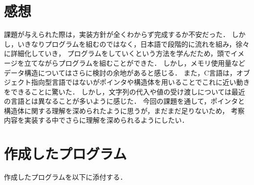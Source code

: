 \documentclass[a4j,11pt]{jarticle}
\begin{document}
\section{感想}
課題が与えられた際は，実装方針が全くわからず完成するか不安だった．
しかし，いきなりプログラムを組むのではなく，日本語で段階的に流れを組み，徐々に詳細化していき，
プログラムをしていくという方法を学んだため，頭でイメージを立てながらプログラムを組むことができた．
しかし，メモリ使用量などデータ構造についてはさらに検討の余地があると感じる．
また，C言語は，オブジェクト指向型言語ではないがポインタや構造体を用いることでこれに近い動きをできることに驚いた．
しかし，文字列の代入や値の受け渡しについては最近の言語とは異なることが多いように感じた．
今回の課題を通して，ポインタと構造体に関する理解を深められたように思うが，まだまだ足りないため，
考察内容を実装する中でさらに理解を深められるようにしたい．
\section{作成したプログラム}\label{sec:program}

作成したプログラムを以下に添付する．
\end{document}
